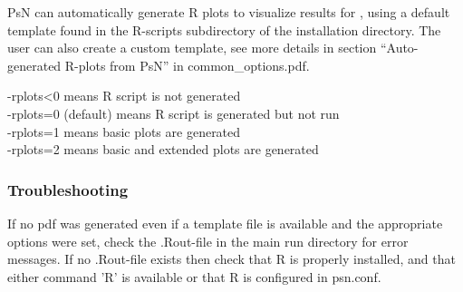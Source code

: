
PsN can automatically generate R plots to visualize results for 
\guidetoolname, using a default template found in the R-scripts subdirectory of the installation directory.
The user can also create a custom template, see more details in section 
``Auto-generated R-plots from PsN'' in common\_options.pdf.

\rplotsconditions

\begin{optionlist}
-rplots<0 means R script is not generated\\ 
-rplots=0 (default) means R script is generated but not run\\ 
-rplots=1 means basic plots are generated\\													  
-rplots=2 means basic and extended plots are generated\\													  
\nextopt
\end{optionlist}

\subsubsection*{Troubleshooting}
If no pdf was generated even if a template file is available and the appropriate options
were set, check the .Rout-file in the main run directory for error messages.
If no .Rout-file exists then check that R is properly installed,
and that either command 'R' is available or that R is configured in psn.conf.
